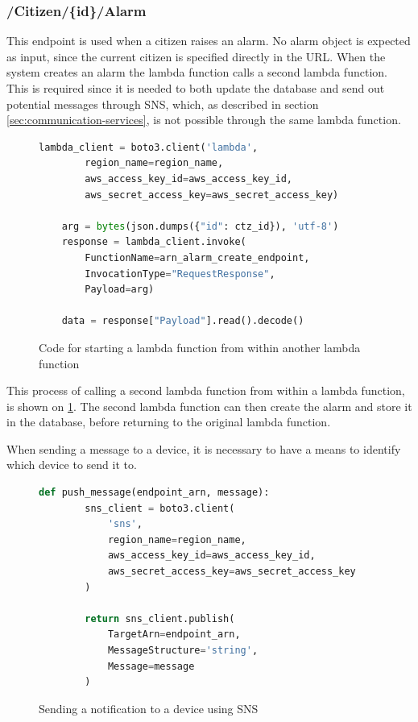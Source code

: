 \subsubsection{/Citizen/\{id\}/Alarm}
This endpoint is used when a citizen raises an alarm. No alarm object is expected as input, since the current citizen is specified directly in the URL. When the system creates an alarm the lambda function calls a second lambda function. This is required since it is needed to both update the database and send out potential messages through SNS, which, as described in section \ref{sec:communication-services}, is not possible through the same lambda function.

\begin{figure}[H]
    \centering
    \begin{lstlisting}[language=Python]
    lambda_client = boto3.client('lambda',
        region_name=region_name,
        aws_access_key_id=aws_access_key_id,
        aws_secret_access_key=aws_secret_access_key)

    arg = bytes(json.dumps({"id": ctz_id}), 'utf-8')
    response = lambda_client.invoke(
        FunctionName=arn_alarm_create_endpoint,
        InvocationType="RequestResponse",
        Payload=arg)

    data = response["Payload"].read().decode()
    \end{lstlisting}
    \caption{Code for starting a lambda function from within another lambda function}
    \label{fig:startlambda}
\end{figure}

This process of calling a second lambda function from within a lambda function, is shown on \ref{fig:startlambda}. The second lambda function can then create the alarm and store it in the database, before returning to the original lambda function.

When sending a message to a device, it is necessary to have a means to identify which device to send it to.

\begin{figure}[H]
    \centering
    \begin{lstlisting}[language=Python]
    def push_message(endpoint_arn, message):
        sns_client = boto3.client(
            'sns',
            region_name=region_name,
            aws_access_key_id=aws_access_key_id,
            aws_secret_access_key=aws_secret_access_key
        )
    
        return sns_client.publish(
            TargetArn=endpoint_arn,
            MessageStructure='string',
            Message=message
        )
    \end{lstlisting}
    \caption{Sending a notification to a device using SNS}
    \label{fig:sns_notification}
\end{figure}

